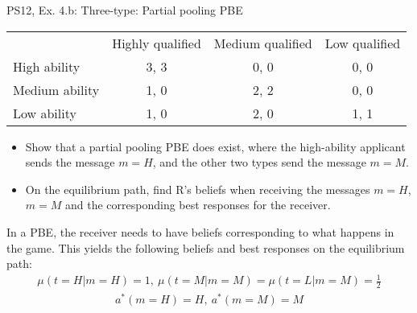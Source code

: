\begin{frame}{PS12, Ex. 4.b: Three-type: Partial pooling PBE}
    \begin{table}
      \begin{tabular}{l|c|c|c|}
          \multicolumn{1}{c}{} & \multicolumn{1}{c}{Highly qualified} & \multicolumn{1}{c}{Medium qualified} & \multicolumn{1}{c}{Low qualified} \\\cline{2-4}
          High ability   & 3, 3 & 0, 0 & 0, 0 \\\cline{2-4}
          Medium ability & 1, 0 & 2, 2 & 0, 0 \\\cline{2-4}
          Low ability    & 1, 0 & 2, 0 & 1, 1 \\\cline{2-4}
      \end{tabular}
    \end{table}\vspace{-8pt}
    \begin{itemize}
      \item[(b)] Show that a partial pooling PBE does exist, where the high-ability applicant sends the message $m = H$, and the other two types send the message $m = M$.
      \item[Step 1:] On the equilibrium path, find R's beliefs when receiving the messages $m=H$, $m=M$ and the corresponding best responses for the receiver.
    \end{itemize}\vspace{-6pt}
    In a PBE, the receiver needs to have beliefs corresponding to what happens in the game. This yields the following beliefs and best responses on the equilibrium path:\vspace{-2pt}
    \begin{align*}
        \mu(t=H|m=H)=1,\
        \mu(t=M|m=M)=\mu(t=L|m=M)=\frac{1}{2}
    \end{align*}\vspace{-18pt}
    \begin{align*}
        a^*(m=H)=H,\ a^*(m=M)=M
    \end{align*}
    \vfill\null
\end{frame}
